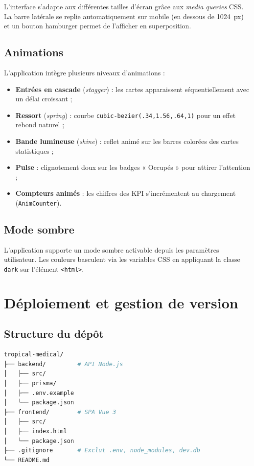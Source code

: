 \documentclass[12pt, a4paper]{report}
\begin{document}
L'interface s'adapte aux différentes tailles d'écran grâce aux \textit{media
queries} CSS. La barre latérale se replie automatiquement sur mobile (en
dessous de 1024~px) et un bouton hamburger permet de l'afficher en superposition.

\section{Animations}

L'application intègre plusieurs niveaux d'animations :
\begin{itemize}
  \item \textbf{Entrées en cascade} (\textit{stagger}) : les cartes apparaissent
        séquentiellement avec un délai croissant ;
  \item \textbf{Ressort} (\textit{spring}) : courbe \texttt{cubic-bezier(.34,1.56,.64,1)}
        pour un effet rebond naturel ;
  \item \textbf{Bande lumineuse} (\textit{shine}) : reflet animé sur les
        barres colorées des cartes statistiques ;
  \item \textbf{Pulse} : clignotement doux sur les badges « Occupés » pour
        attirer l'attention ;
  \item \textbf{Compteurs animés} : les chiffres des KPI s'incrémentent au
        chargement (\texttt{AnimCounter}).
\end{itemize}

\section{Mode sombre}

L'application supporte un mode sombre activable depuis les paramètres
utilisateur. Les couleurs basculent via les variables CSS en appliquant
la classe \texttt{dark} sur l'élément \texttt{<html>}.

\chapter{Déploiement et gestion de version}

\section{Structure du dépôt}

\begin{lstlisting}[language=bash, caption={Structure racine du projet}]
tropical-medical/
├── backend/         # API Node.js
│   ├── src/
│   ├── prisma/
│   ├── .env.example
│   └── package.json
├── frontend/        # SPA Vue 3
│   ├── src/
│   ├── index.html
│   └── package.json
├── .gitignore       # Exclut .env, node_modules, dev.db
└── README.md
\end{lstlisting}
\end{document}
